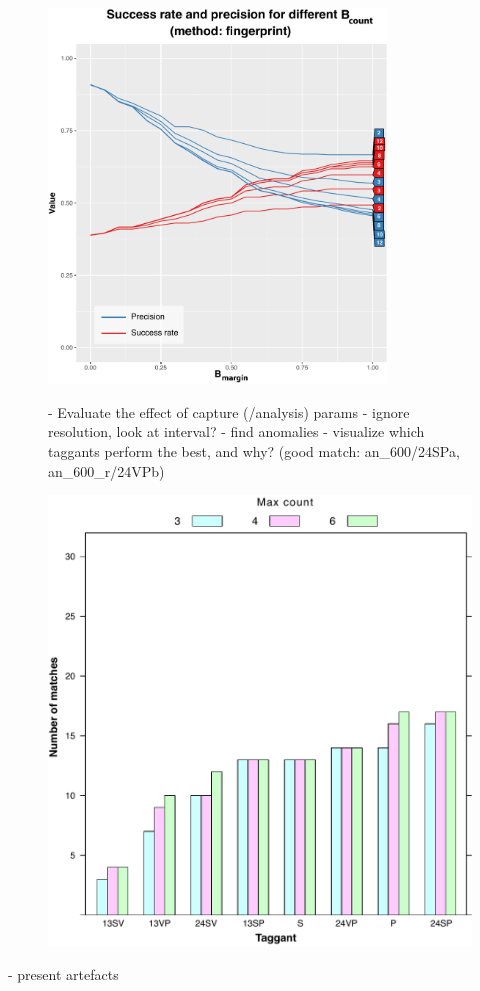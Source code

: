 \documentclass[thesis.tex]{subfiles}
\begin{document}
\begin{figure}[h]
\centering \includegraphics[page=3,width=0.8\textwidth,height=\textheight,keepaspectratio=true]{images/experiment/match_precision}
\end{figure}
\begin{figure}[h]

- Evaluate the effect of capture (/analysis) params
  - ignore resolution, look at interval?
  - find anomalies
  - visualize which taggants perform the best, and why? (good match: an\_600/24SPa, an\_600\_r/24VPb)

\centering \includegraphics[page=7,width=\textwidth,height=\textheight,keepaspectratio=true]{images/experiment/tags_configs}
\end{figure}

- present artefacts
\end{document}
